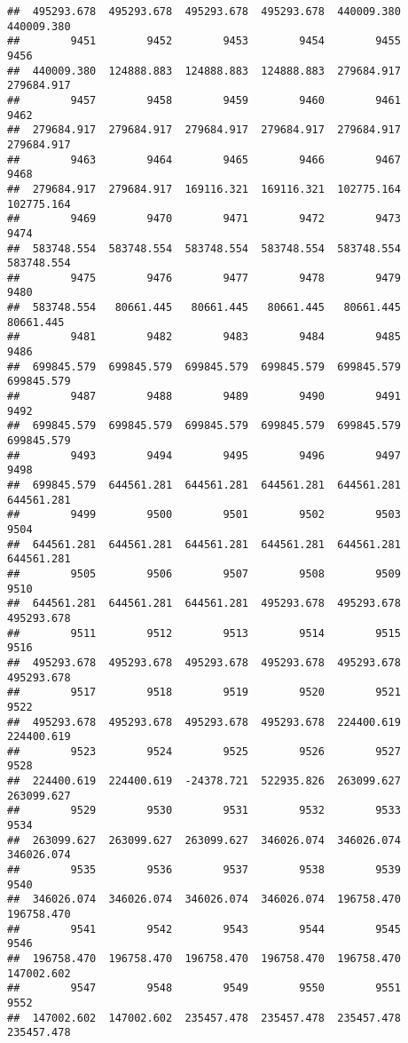 \documentclass[
]{book}
\begin{document}
\begin{verbatim}
##  495293.678  495293.678  495293.678  495293.678  440009.380  440009.380 
##        9451        9452        9453        9454        9455        9456 
##  440009.380  124888.883  124888.883  124888.883  279684.917  279684.917 
##        9457        9458        9459        9460        9461        9462 
##  279684.917  279684.917  279684.917  279684.917  279684.917  279684.917 
##        9463        9464        9465        9466        9467        9468 
##  279684.917  279684.917  169116.321  169116.321  102775.164  102775.164 
##        9469        9470        9471        9472        9473        9474 
##  583748.554  583748.554  583748.554  583748.554  583748.554  583748.554 
##        9475        9476        9477        9478        9479        9480 
##  583748.554   80661.445   80661.445   80661.445   80661.445   80661.445 
##        9481        9482        9483        9484        9485        9486 
##  699845.579  699845.579  699845.579  699845.579  699845.579  699845.579 
##        9487        9488        9489        9490        9491        9492 
##  699845.579  699845.579  699845.579  699845.579  699845.579  699845.579 
##        9493        9494        9495        9496        9497        9498 
##  699845.579  644561.281  644561.281  644561.281  644561.281  644561.281 
##        9499        9500        9501        9502        9503        9504 
##  644561.281  644561.281  644561.281  644561.281  644561.281  644561.281 
##        9505        9506        9507        9508        9509        9510 
##  644561.281  644561.281  644561.281  495293.678  495293.678  495293.678 
##        9511        9512        9513        9514        9515        9516 
##  495293.678  495293.678  495293.678  495293.678  495293.678  495293.678 
##        9517        9518        9519        9520        9521        9522 
##  495293.678  495293.678  495293.678  495293.678  224400.619  224400.619 
##        9523        9524        9525        9526        9527        9528 
##  224400.619  224400.619  -24378.721  522935.826  263099.627  263099.627 
##        9529        9530        9531        9532        9533        9534 
##  263099.627  263099.627  263099.627  346026.074  346026.074  346026.074 
##        9535        9536        9537        9538        9539        9540 
##  346026.074  346026.074  346026.074  346026.074  196758.470  196758.470 
##        9541        9542        9543        9544        9545        9546 
##  196758.470  196758.470  196758.470  196758.470  196758.470  147002.602 
##        9547        9548        9549        9550        9551        9552 
##  147002.602  147002.602  235457.478  235457.478  235457.478  235457.478 

\end{verbatim}
\end{document}
